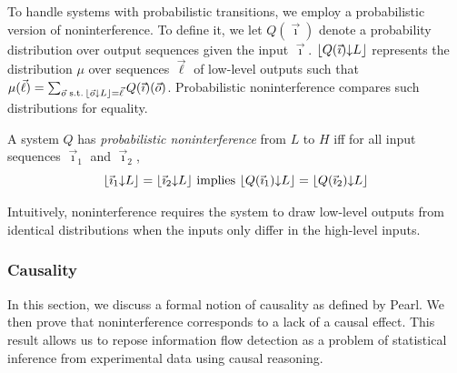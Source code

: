 \documentclass[10pt, onecolumn]{report}
\begin{document}

To handle systems with probabilistic transitions, we employ a 
probabilistic version of noninterference. 
To define it, we let $Q(\vec{\imath})$ denote a probability distribution 
over output sequences given the input $\vec{\imath}$.
$\lfloor{Q(\vec{\imath})}{\downarrow}{L}\rfloor$ represents
the distribution $\mu$ over sequences $\vec{\ell}$ of low-level 
outputs such that 
$\mu(\vec{\ell}) = \sum_{\vec{o} \operatorname{\,s.t.\,} \lfloor{\vec{o}}{\downarrow}{L}\rfloor = 
\vec{\ell}} Q(\vec{\imath})(\vec{o})$.  
Probabilistic noninterference compares such distributions for equality.

\begin{definition}
A system $Q$ has \emph{probabilistic noninterference} from $L$ to $H$ iff for all input sequences $\vec{\imath}_1$ and $\vec{\imath}_2$, 
\[ \lfloor{\vec{\imath}_1}{\downarrow}{L}\rfloor = \lfloor{\vec{\imath}_2}{\downarrow}{L}\rfloor \text{ implies } \lfloor{Q(\vec{\imath}_1)}{\downarrow}{L}\rfloor = \lfloor{Q(\vec{\imath}_2)}{\downarrow}{L}\rfloor \]
\end{definition}

Intuitively, noninterference requires the system to draw low-level outputs from
identical distributions when the inputs only differ in the high-level inputs. 

\subsubsection{Causality} 
\label{sec:cause}

In this section, we discuss a formal notion of causality as defined by Pearl. 
We then prove that noninterference corresponds 
to a lack of a causal effect. This result allows us to repose information flow detection 
as a problem of statistical inference from experimental data using causal reasoning.

\end{document}

